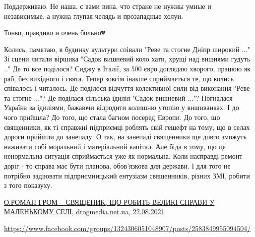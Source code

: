 \begin{itemize}
 
Поддерживаю. Не наша, с вами вина, что стране не нужны умные и независимые, а нужна глупая челядь и прозападные холуи.

 
Тонко, правдиво и очень больно💔

 

\obeycr
Колись, памятаю, в будинку культури співали
"Реве та стогне Дніпр широкий ..."
Зі сцени читали віршика
"Садок вишневий коло хати, хрущі над вишнями гудуть .."
Де то все поділося?
Сиджу в Італії, за 500 євро доглядаю хворого, працюю як раб, без вихідного і свята.
Тепер зовсім інакше сприймається те, що колись співалось і читалось.
Де поділося відчуття колективної сили від виконання "Реве та стогне ..."?
Де поділася сільська ідилія "Садок вишневий ..."?
Погналася Україна за ідиліями, бажаючи відродити колишню утопію у вишиванках.
І до чого прийшла?
До того, що стала багном посеред Європи.
До того, що священники, як ті справжні підприємці роблять свій гешефт на тому, що в селах дороги прийшли до занепаду.
О так, на занепаді священники ще довго зможуть наживати собі моральний і матеріальний капітал.
Але біда в тому, що ця ненормальна ситуація сприймається уже як нормальна.
Коли насправді ремонт доріг - то справа має бути планова, обов'язкова для держави. І для того не потрібно задіювати підприємницький ентузіазм священників, різних ЗМІ, робити з того показуху.
\restorecr

\href{https://drogmedia.net.ua/2021/08/22/o-roman-grom-svyashheny-k-shho-roby-t-vely-ki-spravy-u-malen-komu-seli/}{%
О.РОМАН ГРОМ – СВЯЩЕНИК, ЩО РОБИТЬ ВЕЛИКІ СПРАВИ У МАЛЕНЬКОМУ СЕЛІ, drogmedia.net.ua, 22.08.2021%
}

\url{https://www.facebook.com/groups/1324306051048907/posts/2583849955094504/}


\end{itemize}

